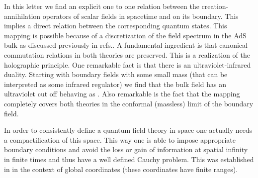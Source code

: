 \documentclass[a4paper,12pt]{article}
\begin{document}
In this letter we find an explicit one to one relation  between the 
creation-annihilation operators of scalar fields  in \coordHE{} spacetime and on 
its boundary. This implies a direct relation between the corresponding quantum states.
This mapping is possible because of a discretization of the field spectrum in
the AdS bulk as discussed previously in refs.\cite{BB1,BB2}.
A fundamental ingredient is that canonical commutation relations in both theories 
are preserved. This is a realization of the holographic principle.
One remarkable fact is that there is an ultraviolet-infrared duality.
Starting with boundary fields with some small mass \myHighlight{$\mu$}\coordHE{} (that can be interpreted
as some infrared regulator) we find that the bulk field has an ultraviolet
cut off behaving as \coordHE{}.  Also remarkable is the fact that the mapping 
completely covers  both theories  in  the conformal (massless) limit of the
boundary field. 


In order to consistently define a quantum field theory in \coordHE{} space 
one actually needs a compactification of this space.
This way one is able to impose appropriate boundary conditions  
and avoid the loss or gain of information at spatial infinity in finite 
times and thus have a well defined Cauchy problem. 
This was established in \cite{QAdS1,QAdS2} in the context of 
global coordinates (these coordinates  have finite ranges).
  
\end{document}
